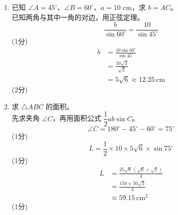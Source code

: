 \documentclass[12pt,a4paper]{exam-zh}
\begin{document}
\begin{solution}
    \begin{enumerate}[label=(\alph*)]
        \item 已知 $\angle A = 45^\circ$、$\angle B = 60^\circ$、$a = 10$ cm，求 $b = AC$。 \\
        已知两角与其中一角的对边，用正弦定理。 \\
        \[
            \frac{b}{\sin 60^\circ} = \frac{10}{\sin 45^\circ}
        \]
        \hfill (1分) \\
        \begin{align*}
            b &= \frac{10\sin 60^\circ}{\sin 45^\circ} \\
              &= \frac{10\sqrt{3}}{\sqrt{2}} \\
              &= 5\sqrt{6} \approx 12.25 \ \mathrm{cm}
        \end{align*}
        \hfill (2分)

        \item 求 $\triangle ABC$ 的面积。 \\
        先求夹角 $\angle C$，再用面积公式 $\dfrac{1}{2}ab\sin C$。 \\
        \[
            \angle C = 180^\circ - 45^\circ - 60^\circ = 75^\circ
        \]
        \hfill (1分) \\
        \[
            L = \frac{1}{2}\times 10 \times 5\sqrt{6}\times \sin 75^\circ
        \]
        \hfill (1分) \\
        \begin{align*}
            L &= \frac{25\sqrt{6}\,(\sqrt{6}+\sqrt{2})}{4} \\
              &= \frac{150+50\sqrt{3}}{4} \\
              &\approx 59.15 \ \mathrm{cm}^2
        \end{align*}
        \hfill (1分)
    \end{enumerate}
\end{solution}
\end{document}
